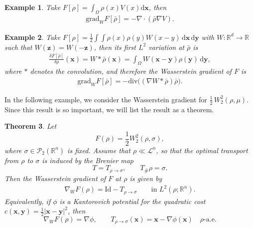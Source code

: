 \documentclass[11pt]{book}
\newtheorem{theorem}{Theorem}[section]
\newtheorem{example}[theorem]{Example}
\newcommand{\dx}{\mathrm{d}\mathbf{x}}
\newcommand{\R}{\mathbb{R}}
\newcommand{\bx}{\mathbf x}
\newcommand{\by}{\mathbf y}
\newcommand{\id}{\mathrm{Id}}
\newcommand{\W}{W_2}
\newcommand{\gradw}{\nabla_{\!W}}
\begin{document}
\begin{example}
    Take $F[\rho]=\int_{\Omega}\rho(x)V(x) \dx$, then
    \begin{align*}
        \mathrm{grad}_W F[\bar{\rho}] = - \nabla\cdot(\bar{\rho}\nabla V).
    \end{align*}
\end{example}

\begin{example}
Take \( F[\rho] = \frac{1}{2} \int \int \rho(x) \rho(y) W(x-y) \, \dx \, \mathrm{d}\mathbf{y} \) 
with \( W : \mathbb{R}^d \to \mathbb{R} \) such that \( W(\mathbf{z}) = W(-\mathbf{z}) \), then its first \( L^2 \) variation at \( \bar{\rho} \) is
\begin{align*}
    \frac{\delta F[\bar{\rho}]}{\delta \rho}(\mathbf{x}) = W \ast \bar{\rho}(\mathbf{x}) = \int_\Omega W(\mathbf{x}-\mathbf{y}) \rho(\mathbf{y}) \, \mathrm{d}\mathbf{y},
\end{align*}
where \( \ast \) denotes the convolution, and therefore the Wasserstein gradient of \( F \) is
\begin{align*}
    \mathrm{grad}_{W} F[\bar{\rho}] = -\mathrm{div}\big((\nabla W \ast \bar{\rho}) \bar{\rho} \big).
\end{align*}
\end{example}


In the following example, we consider the Wasserstein gradient for $\frac12\,\W^2(\rho,\mu)$. Since this result is so important, we will list the result as a theorem.

\begin{theorem}
Let
\[
F(\rho) = \frac12 W_2^2(\rho,\sigma),
\]
where $\sigma\in \mathcal P_2(\R^n)$ is fixed. Assume that $\rho\ll \mathcal L^n$, so that the optimal transport from $\rho$ to $\sigma$ is induced by the Brenier map
\[
T = T_{\rho\to\sigma},\qquad T_\#\rho = \sigma.
\]
Then the Wasserstein gradient of $F$ at $\rho$ is given by
\begin{align}
\gradw F(\rho) = \id - T_{\rho\to\sigma}
\qquad \text{in } L^2(\rho;\R^n).
\end{align}
Equivalently, if $\phi$ is a Kantorovich potential for the quadratic cost $c(\bx,\by)=\frac12|\bx-\by|^2$, then
\[
\gradw F(\rho)=\nabla \phi,
\qquad
T_{\rho\to\sigma}(\bx)=\bx-\nabla\phi(\bx)
\quad \rho\text{-a.e.}
\]
\end{theorem}
\end{document}
